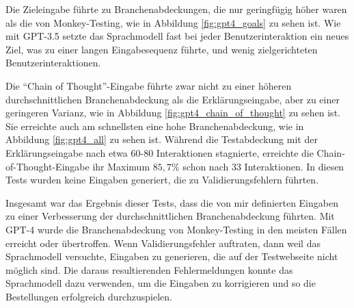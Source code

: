 Die Zieleingabe führte zu Branchenabdeckungen, die nur geringfügig höher waren als die von Monkey-Testing, wie in Abbildung \ref{fig:gpt4_goals} zu sehen ist.
Wie mit GPT-3.5 setzte das Sprachmodell fast bei jeder Benutzerinteraktion ein neues Ziel, was zu einer langen Eingabesequenz führte, und wenig zielgerichteten Benutzerinteraktionen.

Die \enquote{Chain of Thought}-Eingabe führte zwar nicht zu einer höheren durchschnittlichen Branchenabdeckung als die Erklärungseingabe, aber zu einer geringeren Varianz, wie in Abbildung \ref{fig:gpt4_chain_of_thought} zu sehen ist.
Sie erreichte auch am schnellsten eine hohe Branchenabdeckung, wie in Abbildung \ref{fig:gpt4_all} zu sehen ist.
Während die Testabdeckung mit der Erklärungseingabe nach etwa 60-80 Interaktionen stagnierte, erreichte die Chain-of-Thought-Eingabe ihr Maximum $85{,}7\%$ schon nach 33 Interaktionen.
In diesen Tests wurden keine Eingaben generiert, die zu Validierungsfehlern führten.

Insgesamt war das Ergebnis dieser Tests, dass die von mir definierten Eingaben zu einer Verbesserung der durchschnittlichen Branchenabdeckung führten.
Mit GPT-4 wurde die Branchenabdeckung von Monkey-Testing in den meisten Fällen erreicht oder übertroffen.
Wenn Validierungsfehler auftraten, dann weil das Sprachmodell versuchte, Eingaben zu generieren, die auf der Testwebseite nicht möglich sind.
Die daraus resultierenden Fehlermeldungen konnte das Sprachmodell dazu verwenden, um die Eingaben zu korrigieren und so die Bestellungen erfolgreich durchzuspielen.
